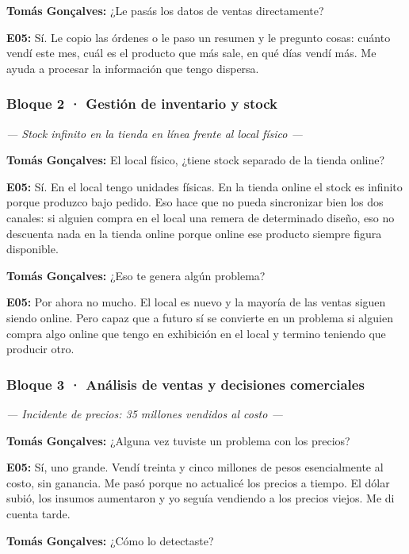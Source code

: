 \noindent\textbf{Tomás Gonçalves:} ¿Le pasás los datos de ventas directamente?

\noindent\textbf{E05:} Sí. Le copio las órdenes o le paso un resumen y le pregunto cosas: cuánto vendí este mes, cuál es el producto que más sale, en qué días vendí más. Me ayuda a procesar la información que tengo dispersa.

\subsubsection*{Bloque 2 · Gestión de inventario y stock}

\noindent\textit{--- Stock infinito en la tienda en línea frente al local físico ---}

\noindent\textbf{Tomás Gonçalves:} El local físico, ¿tiene stock separado de la tienda online?

\noindent\textbf{E05:} Sí. En el local tengo unidades físicas. En la tienda online el stock es infinito porque produzco bajo pedido. Eso hace que no pueda sincronizar bien los dos canales: si alguien compra en el local una remera de determinado diseño, eso no descuenta nada en la tienda online porque online ese producto siempre figura disponible.

\noindent\textbf{Tomás Gonçalves:} ¿Eso te genera algún problema?

\noindent\textbf{E05:} Por ahora no mucho. El local es nuevo y la mayoría de las ventas siguen siendo online. Pero capaz que a futuro sí se convierte en un problema si alguien compra algo online que tengo en exhibición en el local y termino teniendo que producir otro.

\subsubsection*{Bloque 3 · Análisis de ventas y decisiones comerciales}

\noindent\textit{--- Incidente de precios: 35 millones vendidos al costo ---}

\noindent\textbf{Tomás Gonçalves:} ¿Alguna vez tuviste un problema con los precios?

\noindent\textbf{E05:} Sí, uno grande. Vendí treinta y cinco millones de pesos esencialmente al costo, sin ganancia. Me pasó porque no actualicé los precios a tiempo. El dólar subió, los insumos aumentaron y yo seguía vendiendo a los precios viejos. Me di cuenta tarde.

\noindent\textbf{Tomás Gonçalves:} ¿Cómo lo detectaste?

